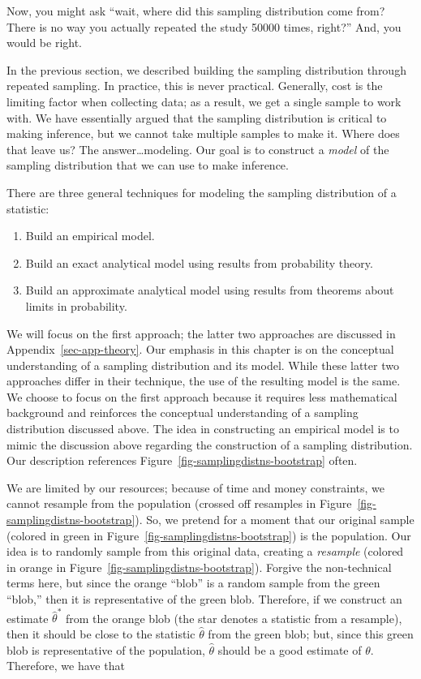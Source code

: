 \documentclass[
  letterpaper,
  DIV=11,
  numbers=noendperiod]{scrreprt}
\providecommand{\tightlist}{%
  \setlength{\itemsep}{0pt}\setlength{\parskip}{0pt}}\usepackage{longtable,booktabs,array}
\theoremstyle{definition}
\theoremstyle{definition}
\theoremstyle{plain}
\theoremstyle{remark}
\begin{document}
Now, you might ask ``wait, where did this sampling distribution come
from? There is no way you actually repeated the study 50000 times,
right?'' And, you would be right.

In the previous section, we described building the sampling distribution
through repeated sampling. In practice, this is never practical.
Generally, cost is the limiting factor when collecting data; as a
result, we get a single sample to work with. We have essentially argued
that the sampling distribution is critical to making inference, but we
cannot take multiple samples to make it. Where does that leave us? The
answer\ldots modeling. Our goal is to construct a \emph{model} of the
sampling distribution that we can use to make inference.

There are three general techniques for modeling the sampling
distribution of a statistic:

\begin{enumerate}
\def\labelenumi{\arabic{enumi}.}
\tightlist
\item
  Build an empirical model.
\item
  Build an exact analytical model using results from probability theory.
\item
  Build an approximate analytical model using results from theorems
  about limits in probability.
\end{enumerate}

We will focus on the first approach; the latter two approaches are
discussed in Appendix~\ref{sec-app-theory}. Our emphasis in this chapter
is on the conceptual understanding of a sampling distribution and its
model. While these latter two approaches differ in their technique, the
use of the resulting model is the same. We choose to focus on the first
approach because it requires less mathematical background and reinforces
the conceptual understanding of a sampling distribution discussed above.
The idea in constructing an empirical model is to mimic the discussion
above regarding the construction of a sampling distribution. Our
description references Figure~\ref{fig-samplingdistns-bootstrap} often.

We are limited by our resources; because of time and money constraints,
we cannot resample from the population (crossed off resamples in
Figure~\ref{fig-samplingdistns-bootstrap}). So, we pretend for a moment
that our original sample (colored in green in
Figure~\ref{fig-samplingdistns-bootstrap}) is the population. Our idea
is to randomly sample from this original data, creating a
\emph{resample} (colored in orange in
Figure~\ref{fig-samplingdistns-bootstrap}). Forgive the non-technical
terms here, but since the orange ``blob'' is a random sample from the
green ``blob,'' then it is representative of the green blob. Therefore,
if we construct an estimate \(\widehat{\theta}^*\) from the orange blob
(the star denotes a statistic from a resample), then it should be close
to the statistic \(\widehat{\theta}\) from the green blob; but, since
this green blob is representative of the population,
\(\widehat{\theta}\) should be a good estimate of \(\theta\). Therefore,
we have that
\end{document}
